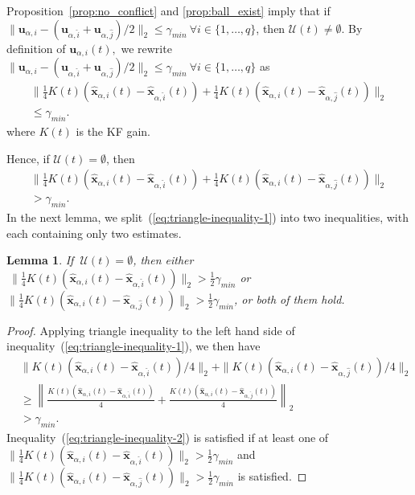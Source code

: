 \documentclass[journal]{IEEEtran}
\newtheorem{Lemma}{Lemma}
\begin{document}
Proposition~\ref{prop:no_conflict} and \ref{prop:ball_exist} imply that if $\|\mathbf{u}_{\alpha,i} - (\mathbf{u}_{\alpha,\hat{i}} + \mathbf{u}_{\alpha,\hat{j}})/2\|_2 \leq \gamma_{min} \ \forall i \in \{1,\ldots,q\}$, then $\mathcal{U}(t) \neq \emptyset.$ 
By definition of $\mathbf{u}_{\alpha,i}(t),$ we rewrite $\|\mathbf{u}_{\alpha,i} - (\mathbf{u}_{\alpha,\hat{i}} + \mathbf{u}_{\alpha,\hat{j}})/2\|_2 \leq \gamma_{min} \ \forall i \in \{1,\ldots,q\}$ as
\begin{multline}
    \label{eq:triangle-inequality}
    \|\frac{1}{4}K(t)(\mathbf{\hat{x}}_{\alpha,i}(t) - \mathbf{\hat{x}}_{\alpha,\hat{i}}(t)) + \frac{1}{4}K(t)(\mathbf{\hat{x}}_{\alpha,i}(t) - \mathbf{\hat{x}}_{\alpha,\hat{j}}(t))\|_2 \\ \leq \gamma_{min}.
\end{multline}
where $K(t)$ is the KF gain. 

Hence, if $\mathcal{U}(t) = \emptyset$, then 
\begin{multline}
\label{eq:triangle-inequality-1}
    \|\frac{1}{4}K(t)(\mathbf{\hat{x}}_{\alpha,i}(t) - \mathbf{\hat{x}}_{\alpha,\hat{i}}(t)) + \frac{1}{4}K(t)(\mathbf{\hat{x}}_{\alpha,i}(t) - \mathbf{\hat{x}}_{\alpha,\hat{j}}(t))\|_2 \\
        > \gamma_{min}.
\end{multline}
In the next lemma, we split~(\ref{eq:triangle-inequality-1}) into two inequalities, with each containing only two estimates.

\begin{Lemma}
\label{lemma:triange-inequality}
If $\ \mathcal{U}(t) = \emptyset$, then either $\ \|\frac{1}{4}K(t)(\mathbf{\hat{x}}_{\alpha,i}(t) - \mathbf{\hat{x}}_{\alpha,\hat{i}}(t))\|_2 > \frac{1}{2}\gamma_{min}$ or $\|\frac{1}{4}K(t)(\mathbf{\hat{x}}_{\alpha,i}(t) - \mathbf{\hat{x}}_{\alpha,\hat{j}}(t))\|_2 > \frac{1}{2}\gamma_{min}$, or both of them hold. 
\end{Lemma}

\begin{proof}
Applying triangle inequality to the left hand side of inequality~(\ref{eq:triangle-inequality-1}), we then have
\begin{align}
        &\|K(t)(\mathbf{\hat{x}}_{\alpha,i}(t) - \mathbf{\hat{x}}_{\alpha,\hat{i}}(t))/4\|_2+ \|K(t)(\mathbf{\hat{x}}_{\alpha,i}(t) - \mathbf{\hat{x}}_{\alpha,\hat{j}}(t))/4\|_2 \nonumber\\
        &\geq \left\|\frac{K(t)(\mathbf{\hat{x}}_{\alpha,i}(t) - \mathbf{\hat{x}}_{\alpha,\hat{i}}(t))}{4} + \frac{K(t)(\mathbf{\hat{x}}_{\alpha,i}(t) - \mathbf{\hat{x}}_{\alpha,\hat{j}}(t))}{4}\right\|_2 \nonumber\\
        &> \gamma_{min}.
        \label{eq:triangle-inequality-2}
\end{align}
Inequality~(\ref{eq:triangle-inequality-2}) is satisfied if at least one of $\|\frac{1}{4}K(t)(\mathbf{\hat{x}}_{\alpha,i}(t) - \mathbf{\hat{x}}_{\alpha,\hat{i}}(t))\|_2 > \frac{1}{2}\gamma_{min}$ and $\|\frac{1}{4}K(t)(\mathbf{\hat{x}}_{\alpha,i}(t) - \mathbf{\hat{x}}_{\alpha,\hat{j}}(t))\|_2 > \frac{1}{2}\gamma_{min}$ is satisfied.
\end{proof}
\end{document}
